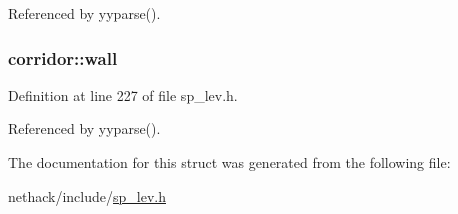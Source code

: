 Referenced by yyparse().

\hypertarget{structcorridor_a07d9e210f604e30abf5c36c7d7db1b71}{
\subsubsection[{wall}]{ corridor\+::wall}}\label{structcorridor_a07d9e210f604e30abf5c36c7d7db1b71}


Definition at line 227 of file sp\+\_\+lev.\+h.



Referenced by yyparse().



The documentation for this struct was generated from the following file\+:\begin{DoxyCompactItemize}
\item 
nethack/include/\hyperlink{sp__lev_8h}{sp\+\_\+lev.\+h}\end{DoxyCompactItemize}
